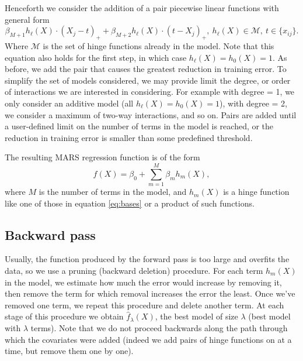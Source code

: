 \documentclass[12pt]{article}
\begin{document}
Henceforth we consider the addition of a pair piecewise linear functions with general form
\begin{equation} \label{eq:gen-pairs-add}
  \beta_{M + 1} h_{\ell}(X) \cdot (X_{j} - t)_{+} + \beta_{M + 2} h_{\ell}(X) \cdot (t - X_{j})_{+}, \ h_{\ell}(X) \in \mathcal{M}, \ t \in \{x_{ij}\}.
\end{equation}
Where $\mathcal{M}$ is the set of hinge functions already in the model. Note that this equation also holds for the first step, in which case $h_{\ell}(X) = h_{0}(X) = 1$. As before, we add the pair that causes the greatest reduction in training error. To simplify the set of models considered, we may provide limit the degree, or order of interactions we are interested in considering. For example with degree = 1, we only consider an additive model (all $h_{\ell}(X) = h_{0}(X) = 1$), with degree = 2, we consider a maximum of two-way interactions, and so on.
Pairs are added until a user-defined limit on the number of terms in the model is reached, or the reduction in training error is smaller than some predefined threshold.

The resulting MARS regression function is of the form
\begin{equation}
  f(X) = \beta_{0} + \sum_{m = 1}^{M} \beta_{m} h_{m}(X),
\end{equation}
where $M$ is the number of terms in the model, and $h_{m}(X)$ is a hinge function like one of those in equation \ref{eq:bases} or a product of such functions.


\subsection{Backward pass} %
\label{sub:backward_pass}

Usually, the function produced by the forward pass is too large and overfits the data, so we use a pruning (backward deletion) procedure. For each term $h_{m}(X)$ in the model, we estimate how much the error would increase by removing it, then remove the term for which removal increases the error the least. Once we've removed one term, we repeat this procedure and delete another term. At each stage of this procedure we obtain $\hat{f}_{\lambda}(X)$, the best model of size $\lambda$ (best model with $\lambda$ terms). Note that we do not proceed backwards along the path through which the covariates were added (indeed we add pairs of hinge functions on at a time, but remove them one by one).
\end{document}
